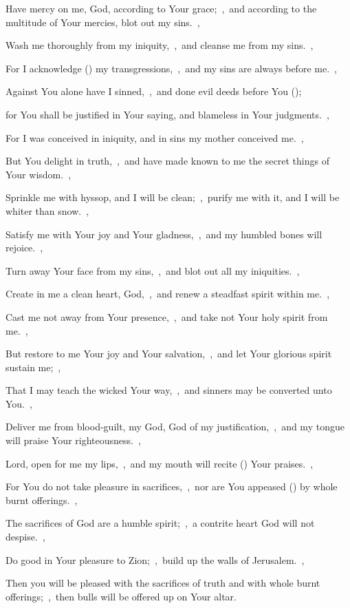 \documentclass[12pt,twoside,a5paper]{article}
\begin{document}
\begin{normalparskip}
  Have mercy on me, God, according to Your grace;~\sep\ and according to the multitude of Your mercies, blot out my sins.~\sep


  Wash me thoroughly from my iniquity,~\sep\ and cleanse me from my sins.~\sep

  For I acknowledge () my transgressions,~\sep\ and my sins are always before me.~\sep

  Against You alone have I sinned,~\sep\ and done evil deeds before You ();

  for You shall be justified in Your saying, and blameless in Your judgments.~\sep

  For I was conceived in iniquity, and in sins my mother conceived me.~\sep

  But You delight in truth,~\sep\ and have made known to me the secret things of Your wisdom.~\sep

  Sprinkle me with hyssop, and I will be clean;~\sep\ purify me with it, and I will be whiter than snow.~\sep

  Satisfy me with Your joy and Your gladness,~\sep\ and my humbled bones will rejoice.~\sep

  Turn away Your face from my sins,~\sep\ and blot out all my iniquities.~\sep

  Create in me a clean heart, God,~\sep\ and renew a steadfast spirit within me.~\sep

  Cast me not away from Your presence,~\sep\ and take not Your holy spirit from me.~\sep

  But restore to me Your joy and Your salvation,~\sep\ and let Your glorious spirit sustain me;~\sep

  That I may teach the wicked Your way,~\sep\ and sinners may be converted unto You.~\sep

  Deliver me from blood-guilt, my God, God of my justification,~\sep\ and my tongue will praise Your righteousness.~\sep

  Lord, open for me my lips,~\sep\ and my mouth will recite () Your praises.~\sep

  For You do not take pleasure in sacrifices,~\sep\ nor are You appeased () by whole burnt offerings.~\sep

  The sacrifices of God are a humble spirit;~\sep\ a contrite heart God will not despise.~\sep

  Do good in Your pleasure to Zion;~\sep\ build up the walls of Jerusalem.~\sep

  Then you will be pleased with the sacrifices of truth and with whole burnt offerings;~\sep\ then bulls will be offered up on Your altar.
\end{normalparskip}
\end{document}
